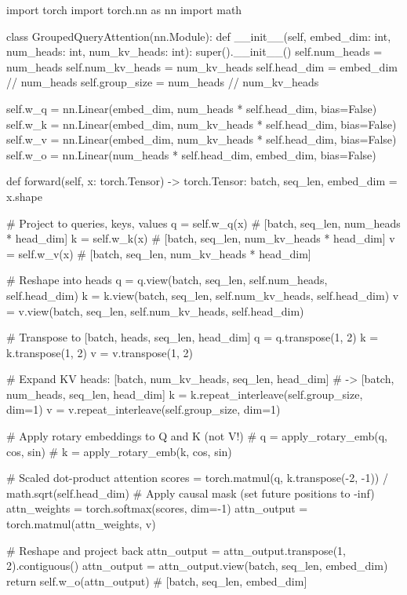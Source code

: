 \begin{pseudocode}
import torch
import torch.nn as nn
import math

class GroupedQueryAttention(nn.Module):
    def __init__(self, embed_dim: int, num_heads: int, num_kv_heads: int):
        super().__init__()
        self.num_heads = num_heads
        self.num_kv_heads = num_kv_heads
        self.head_dim = embed_dim // num_heads
        self.group_size = num_heads // num_kv_heads

        self.w_q = nn.Linear(embed_dim, num_heads * self.head_dim, bias=False)
        self.w_k = nn.Linear(embed_dim, num_kv_heads * self.head_dim, bias=False)
        self.w_v = nn.Linear(embed_dim, num_kv_heads * self.head_dim, bias=False)
        self.w_o = nn.Linear(num_heads * self.head_dim, embed_dim, bias=False)

    def forward(self, x: torch.Tensor) -> torch.Tensor:
        batch, seq_len, embed_dim = x.shape

        # Project to queries, keys, values
        q = self.w_q(x)  # [batch, seq_len, num_heads * head_dim]
        k = self.w_k(x)  # [batch, seq_len, num_kv_heads * head_dim]
        v = self.w_v(x)  # [batch, seq_len, num_kv_heads * head_dim]

        # Reshape into heads
        q = q.view(batch, seq_len, self.num_heads, self.head_dim)
        k = k.view(batch, seq_len, self.num_kv_heads, self.head_dim)
        v = v.view(batch, seq_len, self.num_kv_heads, self.head_dim)

        # Transpose to [batch, heads, seq_len, head_dim]
        q = q.transpose(1, 2)
        k = k.transpose(1, 2)
        v = v.transpose(1, 2)

        # Expand KV heads: [batch, num_kv_heads, seq_len, head_dim]
        #           -> [batch, num_heads, seq_len, head_dim]
        k = k.repeat_interleave(self.group_size, dim=1)
        v = v.repeat_interleave(self.group_size, dim=1)

        # Apply rotary embeddings to Q and K (not V!)
        # q = apply_rotary_emb(q, cos, sin)
        # k = apply_rotary_emb(k, cos, sin)

        # Scaled dot-product attention
        scores = torch.matmul(q, k.transpose(-2, -1)) / math.sqrt(self.head_dim)
        # Apply causal mask (set future positions to -inf)
        attn_weights = torch.softmax(scores, dim=-1)
        attn_output = torch.matmul(attn_weights, v)

        # Reshape and project back
        attn_output = attn_output.transpose(1, 2).contiguous()
        attn_output = attn_output.view(batch, seq_len, embed_dim)
        return self.w_o(attn_output)  # [batch, seq_len, embed_dim]
\end{pseudocode}

